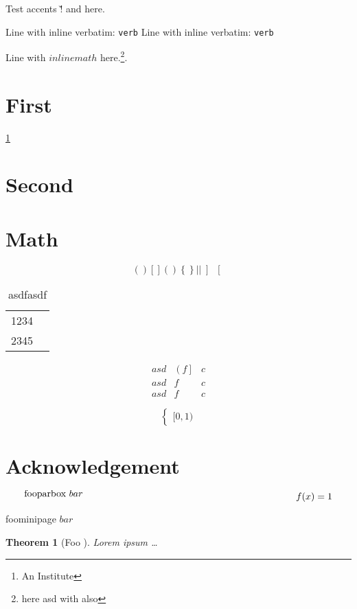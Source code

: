 \documentclass{article}
\begin{document}
Test accents \v! and \v@ here.

Line with inline verbatim: \verb+verb+
Line with inline verbatim: \verb*+verb+

Line with $inline math$ here.\footnote{here {asd} with \cmd also}.

\section{First}
\label{sec:first}

\ref{sec:first}
\pageref{sec:second}
\nocite{bibkey0}
\cite{bibkey1}
\citet*{bibkey2}
\citep{bibkey3}
\citep[e.g.][]{bibkey4}

\section{Second}
\label{sec:second}

\author{A. Author\thanks{An Institute}}

\section{Math}
\label{sec:math}

\begin{equation}
  ( )
  [ ]

  \left( \right)
  \left\{ \right\}
  \left\lvert \right\rvert
  \left] \right[
\end{equation}

\begin{table}
  \centering
  \caption{asdfasdf}
  \label{tab:}
  \begin{tabular}{cr}
    1234 \\
    2345 \\
  \end{tabular}
\end{table}

\begin{equation}
  \begin{array}{ccc}
    asd & \left( f \right] & c \\
    asd & f & c \\
    asd & f & c
  \end{array}
\end{equation}

\begin{equation}
  \begin{cases}
    [0,1)
  \end{cases}
\end{equation}

\section*{Acknowledgement}

\begin{equation}
  \parbox[c][1pt][b]{10cm}{fooparbox $bar$}
  f(x) = 1
\end{equation}

\begin{minipage}[c][1pt][b]{10cm}
  foominipage $bar$
\end{minipage}

\newtheorem{theorem}{Theorem}
\begin{theorem}[Foo {\cite[Theorem 1.1]{Bar}}]
  Lorem ipsum \dots
\end{theorem}
\end{document}
